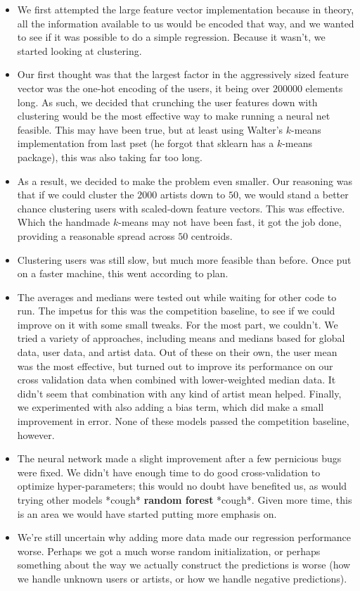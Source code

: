 \documentclass[11pt]{article}
\begin{document}
\begin{itemize}
	\item We first attempted the large feature vector implementation because in theory, all the information available to us would be encoded that way, and we wanted to see if it was possible to do a simple regression. Because it wasn't, we started looking at clustering.
	\item Our first thought was that the largest factor in the aggressively sized feature vector was the one-hot encoding of the users, it being over $200000$ elements long. As such, we decided that crunching the user features down with clustering would be the most effective way to make running a neural net feasible. This may have been true, but at least using Walter's $k$-means implementation from last pset (he forgot that sklearn has a $k$-means package), this was also taking far too long.
	\item As a result, we decided to make the problem even smaller. Our reasoning was that if we could cluster the $2000$ artists down to $50$, we would stand a better chance clustering users with scaled-down feature vectors. This was effective. Which the handmade $k$-means may not have been fast, it got the job done, providing a reasonable spread across $50$ centroids.
	\item Clustering users was still slow, but much more feasible than before. Once put on a faster machine, this went according to plan.
	\item The averages and medians were tested out while waiting for other code to run. The impetus for this was the competition baseline, to see if we could improve on it with some small tweaks. For the most part, we couldn't. We tried a variety of approaches, including means and medians based for global data, user data, and artist data. Out of these on their own, the user mean was the most effective, but turned out to improve its performance on our cross validation data when combined with lower-weighted median data. It didn't seem that combination with any kind of artist mean helped. Finally, we experimented with also adding a bias term, which did make a small improvement in error. None of these models passed the competition baseline, however.
	\item The neural network made a slight improvement after a few pernicious bugs were fixed. We didn't have enough time to do good cross-validation to optimize hyper-parameters; this would no doubt have benefited us, as would trying other models *cough* \textbf{random forest} *cough*. Given more time, this is an area we would have started putting more emphasis on.
	\item We're still uncertain why adding more data made our regression performance worse. Perhaps we got a much worse random initialization, or perhaps something about the way we actually construct the predictions is worse (how we handle unknown users or artists, or how we handle negative predictions).
\end{itemize}
\end{document}
